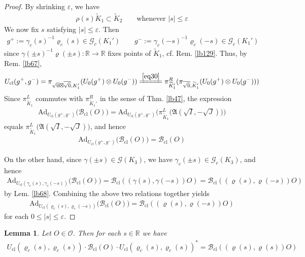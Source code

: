 \documentclass[11pt,b5paper,notitlepage]{article}
\theoremstyle{definition}
\theoremstyle{plain}
\newtheorem{lm}[df]{Lemma}
\newcommand{\fk}{\mathfrak}
\newcommand{\wtd}{\widetilde}
\newcommand{\ovl}{\overline}
\newcommand{\Ad}{\mathrm{Ad}}
\newcommand{\Rbb}{\mathbb R}
\newcommand{\Gc}{\mathscr G_c}
\newcommand{\eps}{\varepsilon}
\newcommand{\MO}{\mathcal O}
\newcommand{\SG}{\mathscr G}
\newcommand{\sqz}{{\sqrt 0}}
\newcommand{\Bcl}{\mathcal B_{\mathrm{cl}}}
\newcommand{\Ucl}{U_{\mathrm{cl}}}
\numberwithin{equation}{section}
\begin{document}
\begin{proof}
By shrinking $\eps$, we have 
\begin{align*}
\rho(s)\wtd K_1\subset\wtd K_2\qquad\text{whenever } |s|\leq\eps
\end{align*}
We now fix $s$ satisfying $|s|\leq\eps$. Then
\begin{align*}
g^+:=\gamma_c(s)^{-1}\varrho_c(s)\in\Gc(K_1')\qquad g^-:=\gamma_c(-s)^{-1}\varrho_c(-s)\in\Gc(K_1')
\end{align*}
since $\gamma(\pm s)^{-1}\varrho(\pm s):\Rbb\rightarrow\Rbb$ fixes points of $\wtd K_1$, cf. Rem. \ref{lb129}. Thus, by Rem. \ref{lb67},
\begin{align*}
\Ucl(g^+,g^-)=\pi_{\sqz\boxtimes\ovl\sqz,K_1'}(U_0(g^+)\otimes U_0(g^-))\xlongequal{\eqref{eq30}}\pi^R_{\wtd K_1'}(\pi_{\ovl\sqz,\wtd K_1'}(U_0(g^+)\otimes U_0(g^-)))
\end{align*}
Since $\pi^L_{\wtd K_1}$ commutes with $\pi^R_{\wtd K_1'}$ in the sense of Thm. \ref{lb47}, the expression
\begin{align*}
\Ad_{\Ucl(g^+,g^-)}\big(\Bcl(O)\big)=\Ad_{\Ucl(g^+,g^-)}\Big(\pi^L_{\wtd K_1}\big(\fk A(\sqrt I,-\sqrt J)\big)\Big)
\end{align*}
equals $\pi^L_{\wtd K_1}\big(\fk A(\sqrt I,-\sqrt J)\big)$, and hence
\begin{align*}
\Ad_{\Ucl(g^+,g^-)}\big(\Bcl(O)\big)=\Bcl(O)
\end{align*}

On the other hand, since $\gamma(\pm s)\in\SG(K_3)$, we have $\gamma_c(\pm s)\in\Gc(K_3)$, and hence
\begin{align*}
\Ad_{\Ucl(\gamma_c(s),\gamma_c(-s))}\big(\Bcl(O)\big)=\Bcl((\gamma(s),\gamma(-s))O)=\Bcl((\varrho(s),\varrho(-s))O)
\end{align*}
by Lem. \ref{lb68}. Combining the above two relations together yields
\begin{align*}
\Ad_{\Ucl(\varrho_c(s),\varrho_c(-s))}\big(\Bcl(O)\big)=\Bcl((\varrho(s),\varrho(-s))O)
\end{align*}
for each $0\leq |s|\leq\eps$. 
\end{proof}


\begin{lm}\label{lb85}
Let $O\in\MO$. Then for each $s\in\Rbb$ we have
\begin{align*}
\Ucl(\varrho_c(s),\varrho_c(s))\cdot\Bcl(O)\cdot\Ucl(\varrho_c(s),\varrho_c(s))^*=\Bcl((\varrho(s),\varrho(s))O)
\end{align*}
\end{lm}
\end{document}
